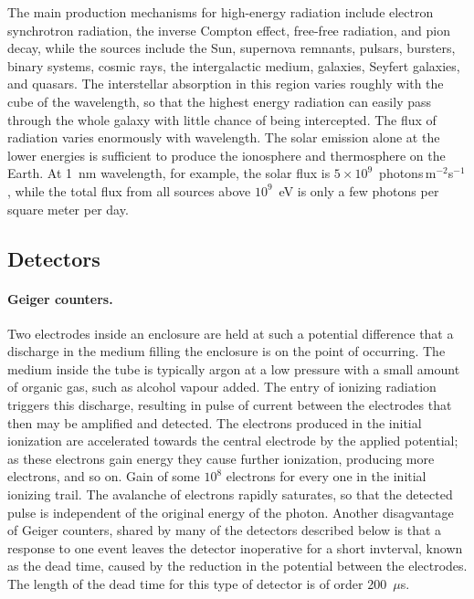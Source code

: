 The main production mechanisms for high-energy radiation include electron
synchrotron radiation, the inverse Compton effect, free-free radiation, 
and pion decay, while the sources include the Sun, supernova remnants, pulsars,
bursters, binary systems, cosmic rays, the intergalactic medium, galaxies,
Seyfert galaxies, and quasars. The interstellar absorption in this region
varies roughly with the cube of the wavelength, so that the highest 
energy radiation can easily pass through the whole galaxy with little 
chance of being intercepted. The flux of radiation varies enormously
with wavelength. The solar emission alone at the lower energies is 
sufficient to produce the ionosphere and thermosphere on the Earth. At 
1~nm wavelength, for example, the solar flux is 
$5\times 10^9$~photons$\,$m$^{-2}$s$^{-1}$, while the total flux from all sources
above $10^9$~eV is only a few photons per square meter per day.

\subsection{Detectors}

\paragraph{Geiger counters.} Two electrodes inside an enclosure are held at such a 
potential difference that a discharge in the medium filling the enclosure
is on the point of occurring. The medium inside the tube is typically argon at a 
low pressure with a small amount of organic gas, such as alcohol vapour added.
The entry of ionizing radiation triggers this discharge,
resulting in pulse of current between the electrodes that then may be amplified and
detected. The electrons produced in the initial ionization are accelerated towards
the central electrode by the applied potential; as these electrons gain energy they
cause further ionization, producing more electrons, and so on. Gain of some $10^8$ electrons for every one in the initial ionizing trail. The avalanche of electrons rapidly 
saturates, so that the detected pulse is independent of the original energy of the
photon. Another disagvantage of Geiger counters, shared by many of the
detectors described below is that a response to one event leaves the
detector inoperative for a short invterval, known as the dead
time, caused by the reduction in the potential between the
electrodes. The length of the dead time for this type of detector is of
order 200~$\mu$s.

